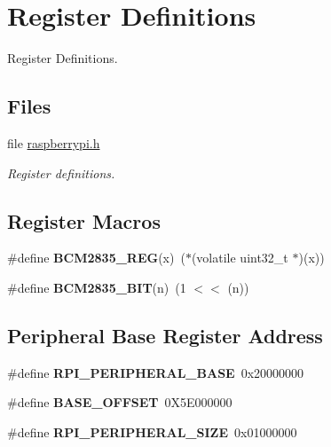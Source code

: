 \hypertarget{group__raspberrypi__reg}{}\section{Register Definitions}
\label{group__raspberrypi__reg}


Register Definitions.  


\subsection*{Files}
\begin{DoxyCompactItemize}
\item 
file \mbox{\hyperlink{raspberrypi_8h}{raspberrypi.\+h}}
\begin{DoxyCompactList}\small\item\em Register definitions. \end{DoxyCompactList}\end{DoxyCompactItemize}
\subsection*{Register Macros}
\begin{DoxyCompactItemize}
\item 
\mbox{\label{group__raspberrypi__reg_ga28f13eda744df5139cd96c2d3946b1e5}} 
\#define {\bfseries B\+C\+M2835\+\_\+\+R\+EG}(x)~($\ast$(volatile uint32\+\_\+t $\ast$)(x))
\item 
\mbox{\label{group__raspberrypi__reg_ga0bf4f942ef1fe3a4f7d79132dfb7c15c}} 
\#define {\bfseries B\+C\+M2835\+\_\+\+B\+IT}(n)~(1 $<$$<$ (n))
\end{DoxyCompactItemize}
\subsection*{Peripheral Base Register Address}
\begin{DoxyCompactItemize}
\item 
\mbox{\label{group__raspberrypi__reg_ga81d37c17dc43afd82ccf9a2afeaa0290}} 
\#define {\bfseries R\+P\+I\+\_\+\+P\+E\+R\+I\+P\+H\+E\+R\+A\+L\+\_\+\+B\+A\+SE}~0x20000000
\item 
\mbox{\label{group__raspberrypi__reg_gac97aa4e68f9c89b8c71d011b0956de1f}} 
\#define {\bfseries B\+A\+S\+E\+\_\+\+O\+F\+F\+S\+ET}~0\+X5\+E000000
\item 
\mbox{\label{group__raspberrypi__reg_gaf63906ac4aa17a273a4c924de1be0280}} 
\#define {\bfseries R\+P\+I\+\_\+\+P\+E\+R\+I\+P\+H\+E\+R\+A\+L\+\_\+\+S\+I\+ZE}~0x01000000
\end{DoxyCompactItemize}
